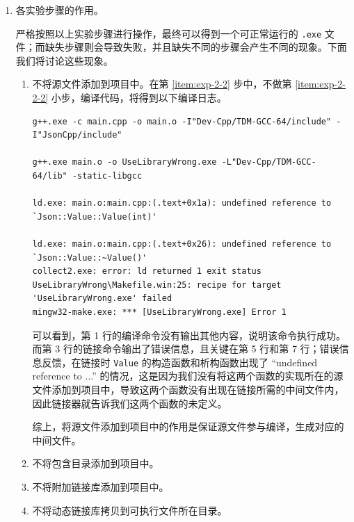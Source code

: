 \begin{enumerate}
	\item 各实验步骤的作用。

	严格按照以上实验步骤进行操作，最终可以得到一个可正常运行的 \lstinline[language={}]{.exe} 文件；而缺失步骤则会导致失败，并且缺失不同的步骤会产生不同的现象。下面我们将讨论这些现象。

	\begin{enumerate}
		\item 不将源文件添加到项目中。在第 \ref{item:exp-2-2} 步中，不做第 \ref{item:exp-2-2-2} 小步，编译代码，将得到以下编译日志。

		\begin{lstlisting}[language={}]
g++.exe -c main.cpp -o main.o -I"Dev-Cpp/TDM-GCC-64/include" -I"JsonCpp/include"

g++.exe main.o -o UseLibraryWrong.exe -L"Dev-Cpp/TDM-GCC-64/lib" -static-libgcc

ld.exe: main.o:main.cpp:(.text+0x1a): undefined reference to `Json::Value::Value(int)'

ld.exe: main.o:main.cpp:(.text+0x26): undefined reference to `Json::Value::~Value()'
collect2.exe: error: ld returned 1 exit status
UseLibraryWrong\Makefile.win:25: recipe for target 'UseLibraryWrong.exe' failed
mingw32-make.exe: *** [UseLibraryWrong.exe] Error 1
		\end{lstlisting}

		可以看到，第 1 行的编译命令没有输出其他内容，说明该命令执行成功。而第 3 行的链接命令输出了错误信息，且关键在第 5 行和第 7 行；错误信息反馈，在链接时 \lstinline[language={[17]C++}, moreemph={[1]Value}]{Value} 的构造函数和析构函数出现了 “undefined reference to ...” 的情况，这是因为我们没有将这两个函数的实现所在的源文件添加到项目中，导致这两个函数没有出现在链接所需的中间文件内，因此链接器就告诉我们这两个函数的未定义。

		综上，将源文件添加到项目中的作用是保证源文件参与编译，生成对应的中间文件。

		\item 不将包含目录添加到项目中。

		\item 不将附加链接库添加到项目中。

		\item 不将动态链接库拷贝到可执行文件所在目录。
	\end{enumerate}
\end{enumerate}
